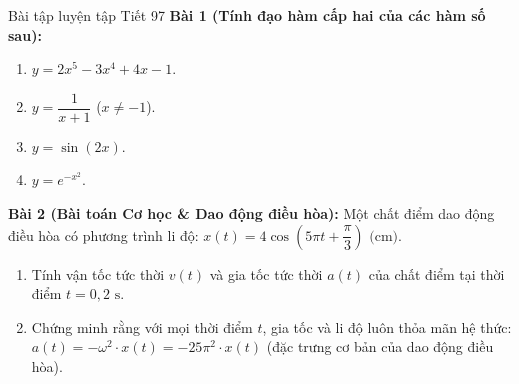 \documentclass[12pt, a4paper]{article}
\begin{document}
\begin{pedabox}{Bài tập luyện tập Tiết 97}
\textbf{Bài 1 (Tính đạo hàm cấp hai của các hàm số sau):}
\begin{enumerate}[leftmargin=0.6cm]
    \item[a)] $y = 2x^5 - 3x^4 + 4x - 1$.
    \item[b)] $y = \dfrac{1}{x + 1}$ ($x \neq -1$).
    \item[c)] $y = \sin(2x)$.
    \item[d)] $y = e^{-x^2}$.
\end{enumerate}

\textbf{Bài 2 (Bài toán Cơ học & Dao động điều hòa):}
Một chất điểm dao động điều hòa có phương trình li độ: $x(t) = 4 \cos\left(5\pi t + \dfrac{\pi}{3}\right)\text{ (cm)}$.
\begin{enumerate}[leftmargin=0.6cm]
    \item Tính vận tốc tức thời $v(t)$ và gia tốc tức thời $a(t)$ của chất điểm tại thời điểm $t = 0{,}2\text{ s}$.
    \item Chứng minh rằng với mọi thời điểm $t$, gia tốc và li độ luôn thỏa mãn hệ thức: $a(t) = -\omega^2 \cdot x(t) = -25\pi^2 \cdot x(t)$ (đặc trưng cơ bản của dao động điều hòa).
\end{enumerate}
\end{pedabox}
\end{document}
